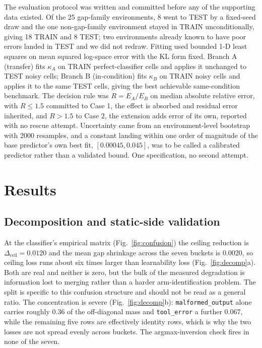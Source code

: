 \documentclass[conference]{IEEEtran}
\begin{document}
The evaluation protocol was written and committed before any of the supporting
data existed. Of the 25 gap-family environments, 8 went to TEST by a fixed-seed
draw and the one non-gap-family environment stayed in TRAIN unconditionally,
giving 18 TRAIN and 8 TEST; two environments already known to have poor errors
landed in TEST and we did not redraw. Fitting used bounded 1-D least squares on
mean squared log-space error with the KL form fixed. Branch A (transfer) fits
$\kappa_A$ on TRAIN perfect-classifier cells and applies it unchanged to TEST
noisy cells; Branch B (in-condition) fits $\kappa_B$ on TRAIN noisy cells and
applies it to the same TEST cells, giving the best achievable same-condition
benchmark. The decision rule was $R = E_A/E_B$ on median absolute relative
error, with $R \leq 1.5$ committed to Case 1, the effect is absorbed and
residual error inherited, and $R > 1.5$ to Case 2, the extension adds error of
its own, reported with no rescue attempt. Uncertainty came from an
environment-level bootstrap with 2000 resamples, and a constant landing within
one order of magnitude of the base predictor's own best fit, $[0.00045,
0.045]$, was to be called a calibrated predictor rather than a validated bound.
One specification, no second attempt.

\section{Results}

\subsection{Decomposition and static-side validation}

At the classifier's empirical matrix (Fig.~\ref{fig:confusion}) the ceiling
reduction is $\Delta_{\mathrm{ceil}} = 0.0120$ and the mean gap shrinkage
across the seven buckets is $0.0020$, so ceiling loss runs about six times
larger than learnability loss (Fig.~\ref{fig:decomp}a). Both are real and
neither is zero, but the bulk of the measured degradation is information lost
to merging rather than a harder arm-identification problem. The split is
specific to this confusion structure and should not be read as a general ratio.
The concentration is severe (Fig.~\ref{fig:decomp}b):
\texttt{malformed\_output} alone carries roughly $0.36$ of the off-diagonal
mass and \texttt{tool\_error} a further $0.067$, while the remaining five rows
are effectively identity rows, which is why the two losses are not spread
evenly across buckets. The argmax-inversion check fires in none of the seven.
\end{document}
